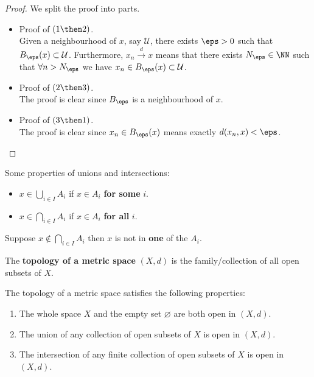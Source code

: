 \documentclass[12pt, a4paper]{article}
\begin{document}
\begin{proof}
    We split the proof into parts.
    \begin{itemize}
        \item Proof of \((1 \then 2)\). \\
        Given a neighbourhood of \(x\), say \(\mathcal{U}\), there exists \(\eps>0\) such that \(B_{\eps}(x) \subset \mathcal{U}\). Furthermore, \(x_n \xrightarrow{d} x\) means that there exists \(N_{\eps} \in \NN\) such that \(\forall n >N_{\eps}\) we have \(x_n \in B_{\eps}(x) \subset \mathcal{U}\).
        \item Proof of \((2 \then 3)\). \\
        The proof is clear since \(B_{\eps}\) is a neighbourhood of \(x\).
        \item Proof of \((3 \then 1)\). \\
        The proof is clear since \(x_n \in B_{\eps}(x)\) means exactly \(d(x_n,x)<\eps\).
    \end{itemize}
\end{proof}

\begin{proposition}
    Some properties of unions and intersections:
    \begin{itemize}
        \item \(x \in \bigcup_{i \in I} A_i\) if \(x \in A_i\) \textbf{for some} \(i\).
        \item \(x \in \bigcap_{i \in I} A_i\) if \(x \in A_i\) \textbf{for all} \(i\).
    \end{itemize}
\end{proposition}

\begin{example}
    Suppose \(x \not\in \bigcap_{i \in I} A_i\) then \(x\) is not in \textbf{one} of the \(A_i\).
\end{example}

\begin{definition}
    The \textbf{topology of a metric space} \((X,d)\) is the family/collection of all open subsets of \(X\).
\end{definition}

\begin{mdthm}
    The topology of a metric space satisfies the following properties:
    \begin{enumerate}
        \item The whole space \(X\) and the empty set \(\varnothing \) are both open in \((X,d)\).
        \item The union of any collection of open subsets of \(X\) is open in \((X,d)\).
        \item The intersection of any finite collection of open subsets of \(X\) is open in \((X,d)\).
    \end{enumerate}
\end{mdthm}
\end{document}
